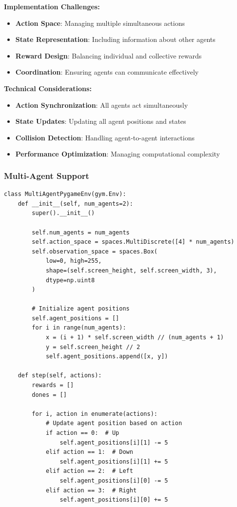 \documentclass[12pt]{article}
\begin{document}
{{{\textbf{Implementation Challenges:}
\begin{itemize}
    \item \textbf{Action Space}: Managing multiple simultaneous actions
    \item \textbf{State Representation}: Including information about other agents
    \item \textbf{Reward Design}: Balancing individual and collective rewards
    \item \textbf{Coordination}: Ensuring agents can communicate effectively
\end{itemize}

\textbf{Technical Considerations:}
\begin{itemize}
    \item \textbf{Action Synchronization}: All agents act simultaneously
    \item \textbf{State Updates}: Updating all agent positions and states
    \item \textbf{Collision Detection}: Handling agent-to-agent interactions
    \item \textbf{Performance Optimization}: Managing computational complexity
\end{itemize}

\subsubsection{Multi-Agent Support}

\begin{verbatim}
class MultiAgentPygameEnv(gym.Env):
    def __init__(self, num_agents=2):
        super().__init__()
        
        self.num_agents = num_agents
        self.action_space = spaces.MultiDiscrete([4] * num_agents)
        self.observation_space = spaces.Box(
            low=0, high=255, 
            shape=(self.screen_height, self.screen_width, 3), 
            dtype=np.uint8
        )
        
        # Initialize agent positions
        self.agent_positions = []
        for i in range(num_agents):
            x = (i + 1) * self.screen_width // (num_agents + 1)
            y = self.screen_height // 2
            self.agent_positions.append([x, y])
            
    def step(self, actions):
        rewards = []
        dones = []
        
        for i, action in enumerate(actions):
            # Update agent position based on action
            if action == 0:  # Up
                self.agent_positions[i][1] -= 5
            elif action == 1:  # Down
                self.agent_positions[i][1] += 5
            elif action == 2:  # Left
                self.agent_positions[i][0] -= 5
            elif action == 3:  # Right
                self.agent_positions[i][0] += 5
                

\end{verbatim}}}}
\end{document}
